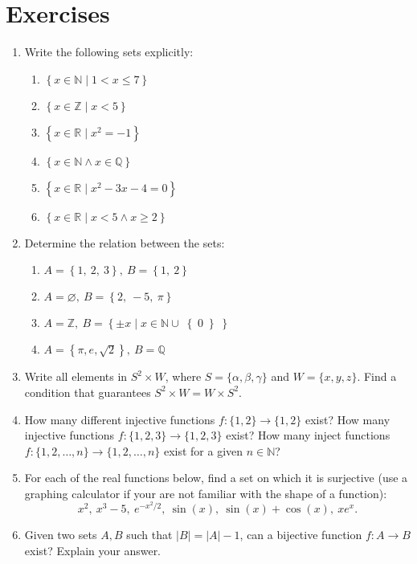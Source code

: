 \section{Exercises}
\begin{enumerate}
  \item Write the following sets explicitly:
    \begin{enumerate}[label=(\roman*)]
      \item $\left\{ x\in \mathbb{N}\mid1<x\leq7\right\}$
      \item $\left\{ x\in \mathbb{Z}\mid x<5\right\}$
      \item $\left\{ x\in \mathbb{R}\mid x^{2}=-1 \right\}$
      \item $\left\{ x\in \mathbb{N} \wedge x\in \mathbb{Q} \right\}$
      \item $\left\{ x\in \mathbb{R} \mid x^{2}-3x-4=0 \right\}$
      \item $\left\{ x\in\mathbb{R}\mid x<5\wedge x \geq 2\right\}$
    \end{enumerate}
  
	\item Determine the relation between the sets:
    \begin{enumerate}[label=(\roman*)]
      \item $A=\left\{ 1,\ 2,\ 3\right\},\ B=\left\{ 1,\ 2 \right\}$
      \item $A=\varnothing,\ B=\left\{ 2,\ -5,\ \pi \right\}$
      \item $A=\mathbb{Z},\ B=\left\{ \pm x \mid x\in\mathbb{N} \cup \right\{0\left\} \right\}$
			\item $A=\left\{\pi, e, \sqrt{2}\right\},\ B=\mathbb{Q}$
    \end{enumerate}

	\item Write all elements in $S^{2}\times W$, where $S=\{\alpha,\beta,\gamma\}$ and $W=\{x,y,z\}$. Find a condition that guarantees $S^{2}\times W = W\times S^{2}$.

	\item How many different injective functions $f:\{1,2\}\to\{1,2\}$ exist? How many injective functions $f:\{1,2,3\}\to\{1,2,3\}$ exist? How many inject functions $f:\{1,2,\dots,n\}\to\{1,2,\dots,n\}$ exist for a given $n\in\mathbb{N}$?

	\item For each of the real functions below, find a set on which it is surjective (use a graphing calculator if your are not familiar with the shape of a function):
		\[
			x^{2},\ x^{3}-5,\ e^{-x^{2}/2},\ \sin(x),\ \sin(x)+\cos(x),\ xe^{x}.
		\]

	\item Given two sets $A,B$ such that $|B|=|A|-1$, can a bijective function $f:A\to B$ exist? Explain your answer.
\end{enumerate}
